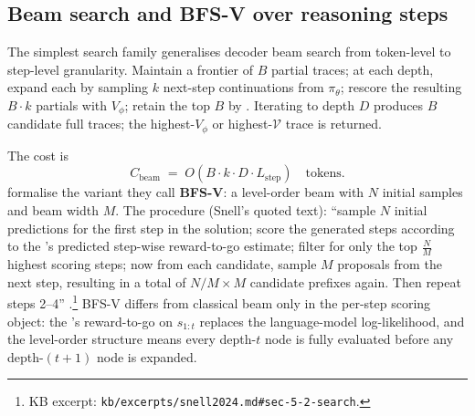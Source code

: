 \subsection{Beam search and BFS-V over reasoning steps}
\label{sec:tree-beam}

The simplest search family generalises decoder beam search from
token-level to step-level granularity. Maintain a frontier of $B$
partial traces; at each depth, expand each by sampling $k$ next-step
continuations from $\pi_\theta$; rescore the resulting $B \cdot k$
partials with $V_\phi$; retain the top $B$ by . Iterating to
depth $D$ produces $B$ candidate full traces; the highest-$V_\phi$ or
highest-$\mathcal{V}$ trace is returned.

The cost is
\begin{equation}
  C_\text{beam} \;=\; O\!\left( B \cdot k \cdot D \cdot L_\text{step} \right)
  \quad\text{tokens.}
  \label{eq:cost-beam}
\end{equation}
\citet[\S 5.2]{snell2024} formalise the variant they call
\textbf{BFS-V}: a level-order beam with $N$ initial samples and beam
width $M$. The procedure (Snell's quoted text): ``sample $N$ initial
predictions for the first step in the solution; score the generated
steps according to the 's predicted step-wise reward-to-go estimate;
filter for only the top $\frac{N}{M}$ highest scoring steps; now from
each candidate, sample $M$ proposals from the next step, resulting in
a total of $N/M \times M$ candidate prefixes again. Then repeat steps
2--4''
\citep[\S 5.2]{snell2024}.\footnote{KB excerpt:
\texttt{kb/excerpts/snell2024.md\#sec-5-2-search}.} BFS-V differs from
classical beam only in the per-step scoring object: the 's
reward-to-go on $s_{1:t}$ replaces the language-model log-likelihood,
and the level-order structure means every depth-$t$ node is fully
evaluated before any depth-$(t+1)$ node is expanded.

